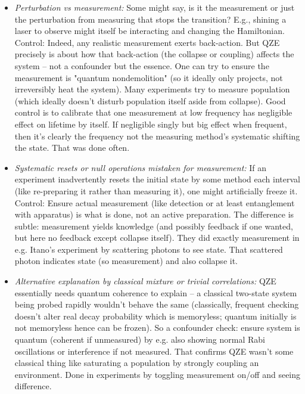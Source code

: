 \documentclass[11pt]{article}
\begin{document}
\begin{itemize}

\item 
\textit{Perturbation vs measurement:} Some might say, is it the measurement or just the perturbation from measuring that stops the transition? E.g., shining a laser to observe might itself be interacting and changing the Hamiltonian. Control: Indeed, any realistic measurement exerts back-action. But QZE precisely is about how that back-action (the collapse or coupling) affects the system – not a confounder but the essence. One can try to ensure the measurement is "quantum nondemolition" (so it ideally only projects, not irreversibly heat the system). Many experiments try to measure population (which ideally doesn't disturb population itself aside from collapse). Good control is to calibrate that one measurement at low frequency has negligible effect on lifetime by itself. If negligible singly but big effect when frequent, then it's clearly the frequency not the measuring method's systematic shifting the state. That was done often.




\item 
\textit{Systematic resets or null operations mistaken for measurement:} If an experiment inadvertently resets the initial state by some method each interval (like re-preparing it rather than measuring it), one might artificially freeze it. Control: Ensure actual measurement (like detection or at least entanglement with apparatus) is what is done, not an active preparation. The difference is subtle: measurement yields knowledge (and possibly feedback if one wanted, but here no feedback except collapse itself). They did exactly measurement in e.g. Itano's experiment by scattering photons to see state. That scattered photon indicates state (so measurement) and also collapse it.




\item 
\textit{Alternative explanation by classical mixture or trivial correlations:} QZE essentially needs quantum coherence to explain – a classical two-state system being probed rapidly wouldn't behave the same (classically, frequent checking doesn't alter real decay probability which is memoryless; quantum initially is not memoryless hence can be frozen). So a confounder check: ensure system is quantum (coherent if unmeasured) by e.g. also showing normal Rabi oscillations or interference if not measured. That confirms QZE wasn't some classical thing like saturating a population by strongly coupling an environment. Done in experiments by toggling measurement on/off and seeing difference.





\end{itemize}
\end{document}

